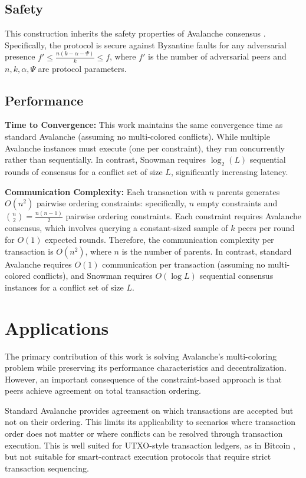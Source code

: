 \documentclass[12pt]{article}
\begin{document}
\subsection{Safety}
This construction inherits the safety properties of Avalanche consensus
\cite{rocket}. Specifically, the protocol is secure against Byzantine faults
for any adversarial presence $f' \leq \frac{n(k-\alpha-\Psi)}{k} \leq f$, where
$f'$ is the number of adversarial peers and $n, k, \alpha, \Psi$ are protocol
parameters.

\subsection{Performance}
\textbf{Time to Convergence:} This work maintains the same convergence time as
standard Avalanche (assuming no multi-colored conflicts). While multiple
Avalanche instances must execute (one per constraint), they run concurrently
rather than sequentially. In contrast, Snowman requires $\log_2(L)$ sequential
rounds of consensus for a conflict set of size $L$, significantly increasing
latency.

\textbf{Communication Complexity:} Each transaction with $n$ parents generates
$O(n^2)$ pairwise ordering constraints: specifically, $n$ empty constraints and
$\binom{n}{2} = \frac{n(n-1)}{2}$ pairwise ordering constraints. Each
constraint requires Avalanche consensus, which involves querying a
constant-sized sample of $k$ peers per round for $O(1)$ expected rounds.
Therefore, the communication complexity per transaction is $O(n^2)$, where $n$
is the number of parents. In contrast, standard Avalanche requires $O(1)$
communication per transaction (assuming no multi-colored conflicts), and
Snowman requires $O(\log L)$ sequential consensus instances for a conflict set
of size $L$.

\section{Applications}
The primary contribution of this work is solving Avalanche's multi-coloring
problem while preserving its performance characteristics and decentralization.
However, an important consequence of the constraint-based approach is that
peers achieve agreement on total transaction ordering.

Standard Avalanche provides agreement on which transactions are accepted but
not on their ordering. This limits its applicability to scenarios where
transaction order does not matter or where conflicts can be resolved through
transaction execution. This is well suited for UTXO-style transaction ledgers,
as in Bitcoin \cite{naka}, but not suitable for smart-contract execution
protocols that require strict transaction sequencing.
\end{document}
